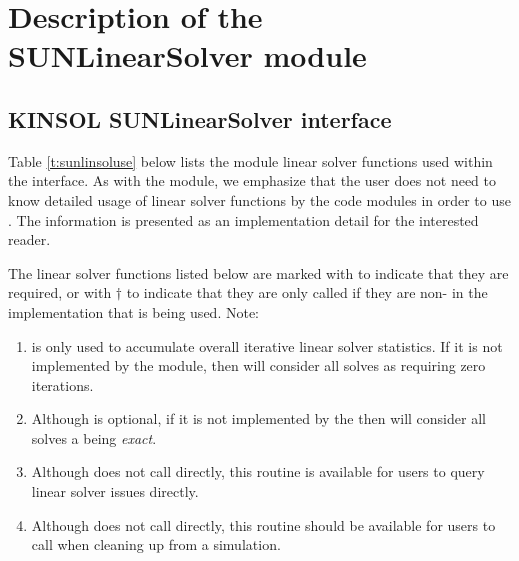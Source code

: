 \chapter{Description of the SUNLinearSolver module}\label{s:sunlinsol}



\section{KINSOL SUNLinearSolver interface}
\label{s:sunlinsol_interface}

Table \ref{t:sunlinsoluse} below lists the {\sunlinsol} module linear solver
functions used within the {\kinls} interface. As with the {\sunmatrix} module, we
emphasize that the {\kinsol} user does not need to know detailed usage of linear
solver functions by the {\kinsol} code modules in order to use {\kinsol}. The
information is presented as an implementation detail for the interested reader.

The linear solver functions listed below are marked with \cm to
indicate that they are required, or with $\dagger$ to indicate that
they are only called if they are non- in the {\sunlinsol}
implementation that is being used. Note:
\begin{enumerate}
\item {} is only used to accumulate overall
  iterative linear solver statistics.  If it is not implemented by
  the {\sunlinsol} module, then {\kinls} will consider all solves as
  requiring zero iterations.
\item Although  is optional, if it is not
  implemented by the {\sunlinsol} then {\kinls} will consider all
   solves a being \emph{exact}.
\item Although {\kinls} does not call 
  directly, this routine is available for users to query linear solver
  issues directly.
\item Although {\kinls} does not call 
  directly, this routine should be available for users to call when
  cleaning up from a simulation.
\end{enumerate}

